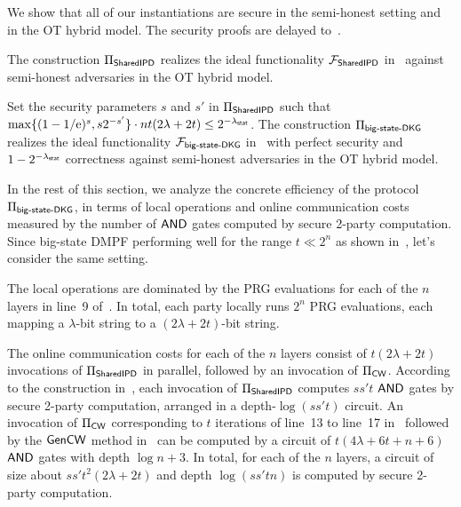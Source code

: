 



We show that all of our instantiations are secure in the semi-honest setting and in the OT hybrid model. The security proofs are delayed to~. 
\begin{lemma}\label{lem:shared—ipd-security}
    The construction $\Pi_{\sf SharedIPD}$ realizes the ideal functionality $\mathcal{F}_{\sf SharedIPD}$ in~ against semi-honest adversaries in the OT hybrid model. 
\end{lemma}
\begin{theorem}\label{thm:big-state-DKG-security}
Set the security parameters $s$ and $s'$ in $\Pi_{\sf SharedIPD}$ such that $\max\{(1-1/\mathrm{e})^s,s2^{-s'}\}\cdot nt(2\lambda+2t)\le 2^{-\lambda_{\sf stat}}$. The construction $\Pi_{\sf big\text{-} state\text{-} DKG}$ realizes the ideal functionality $\mathcal{F}_{\sf big\text{-} state\text{-} DKG}$ in~ with perfect security and $1-2^{-\lambda_{\sf stat}}$ correctness against semi-honest adversaries in the OT hybrid model. 
\end{theorem}

In the rest of this section, we analyze the concrete efficiency of the protocol $\Pi_{\sf big\text{-} state\text{-} DKG}$, in terms of local operations and online communication costs measured by the number of $\sf AND$ gates computed by secure 2-party computation. Since big-state DMPF performing well for the range $t\ll 2^n$ as shown in~, let's consider the same setting.

The local operations are dominated by the PRG evaluations for each of the $n$ layers in line~9 of~. In total, each party locally runs $2^n$ PRG evaluations, each mapping a $\lambda$-bit string to a $(2\lambda+2t)$-bit string. 

The online communication costs for each of the $n$ layers consist of $t(2\lambda+2t)$ invocations of $\Pi_{\sf SharedIPD}$ in parallel, followed by an invocation of $\Pi_{\sf CW}$. According to the construction in~, each invocation of $\Pi_{\sf SharedIPD}$ computes $ss't$ ${\sf AND}$ gates by secure 2-party computation, arranged in a depth-$\log(ss't)$ circuit. An invocation of $\Pi_{\sf CW}$ 
corresponding to $t$ iterations of line~13 to line~17 in~ followed by the ${\sf Gen}{\sf CW}$ method in~ can be computed by a circuit of $t(4\lambda+6t+n+6)$ $\sf AND$ gates with depth $\log n+3$. In total, for each of the $n$ layers, a circuit of size about $ss't^2(2\lambda+2t)$ and depth $\log(ss'tn)$ is computed by secure 2-party computation. 

